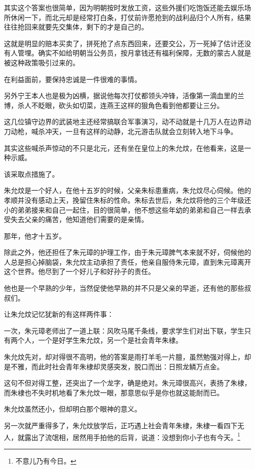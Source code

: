 \begin{multicols}{\theparacolNo}
		其实这个答案也很简单，因为明朝按时发放工资，这些外援们吃饱饭还能去娱乐场所休闲一下，而北元却是经常打白条，打仗前许愿抢到的战利品归个人所有，结果往往抢回来就要先交集体，剩下的才是自己的。

		这就是明显的赔本买卖了，拼死抢了点东西回来，还要交公，万一死掉了估计还没有人管埋。确实不如给明朝当公务员，按月拿钱还有福利保障，无数的蒙古人就是被这种政策吸引过来的。

		在利益面前，要保持忠诚是一件很难的事情。

		另外宁王本人也是极为凶横，据说他每次打仗都领头冲锋，活像第一滴血里的兰博，杀人不眨眼，砍头如切菜，连燕王这样的狠角色看到他都要让三分。

		这几位镇守边界的武装地主还经常搞联合军事演习，动不动就是十几万人在边界动刀动枪，喊杀冲天，一旦有这样的动静，北元游击队就会立刻转入地下斗争。

		其实这些喊杀声惊动的不只是北元，还有坐在皇位上的朱允炆，在他看来，这是一种示威。

		该采取点措施了。

		朱允炆是一个好人，在他十五岁的时候，父亲朱标患重病，朱允炆尽心伺候。他的孝顺并没有感动上天，挽留住朱标的性命。朱标去世后，朱允炆将他的三个年级还小的弟弟接来和自己一起住，目的很简单，他不想这些年幼的弟弟和自己一样去承受失去父亲的痛苦，他知道他们需要的是亲情。

		那年，他才十五岁。

		除此之外，他还担任了朱元璋的护理工作，由于朱元璋脾气本来就不好，伺候他的人总是担心掉脑袋，朱允炆主动承担了责任，他亲自服侍朱元璋，直到朱元璋离开这个世界。他尽到了一个好儿子和好孙子的责任。

		他也是一个早熟的少年，当然促使他早熟的并不只是父亲的早逝，还有他的那些叔叔们。

		让朱允炆记忆犹新的有这样两件事：

		一次，朱元璋老师出了一道上联：风吹马尾千条线，要求学生们对出下联，学生只有两个人，一个是好学生朱允炆，另一个是社会青年朱棣。

		朱允炆先对，却对得很不高明，他的答案是雨打羊毛一片膻，虽然勉强对得上，却是不雅，而此时社会青年朱棣却灵感突发，脱口而出：日照龙鳞万点金。

		这句不但对得工整，还突出了一个龙字，确是绝对。朱元璋很高兴，表扬了朱棣，而朱棣也不失时机地看了朱允炆一眼，那意思似乎是你也就这能耐而已。

		朱允炆虽然还小，但却明白那个眼神的意义。

		另一次就严重得多了，朱允炆放学后，正巧遇上社会青年朱棣，朱棣一看四下无人，就露出了流氓相，居然用手拍他的后背，说道：没想到你小子也有今天。\footnote{不意儿乃有今日。}


\end{multicols}
